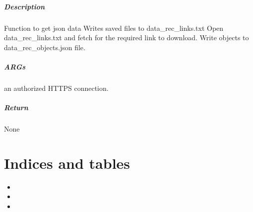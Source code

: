 \documentclass[letterpaper,10pt,english]{sphinxmanual}
\begin{document}
\begin{fulllineitems}
\label{\detokenize{gemini_data_recording:gemini_data_recording.json_binary_data}}
\pysigstartsignatures
{}
\pysigstopsignatures

\paragraph{Description}
\label{\detokenize{gemini_data_recording:id2}}
\sphinxAtStartPar
Function to get json data
Writes saved files to data\_rec\_links.txt
Open data\_rec\_links.txt and fetch for the required link to download.
Write objects to data\_rec\_objects.json file.


\paragraph{ARGs}
\label{\detokenize{gemini_data_recording:id3}}\begin{description}
\sphinxAtStartPar
an authorized HTTPS connection.

\end{description}


\paragraph{Return}
\label{\detokenize{gemini_data_recording:id4}}
\sphinxAtStartPar
None

\end{fulllineitems}



\chapter{Indices and tables}
\label{\detokenize{index:indices-and-tables}}\begin{itemize}
\item {} 
\sphinxAtStartPar
{}

\item {} 
\sphinxAtStartPar
{}

\item {} 
\sphinxAtStartPar
{}

\end{itemize}
\end{document}
